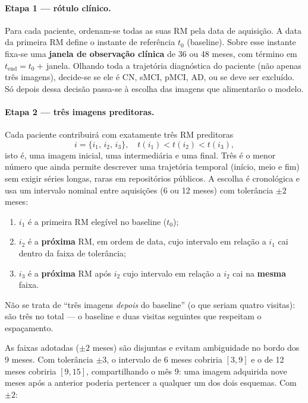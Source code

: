 \documentclass[review]{elsarticle}
\begin{document}
	\paragraph{Etapa 1 --- rótulo clínico.}
	Para cada paciente, ordenam-se todas as suas RM pela data de aquisição.
	A data da primeira RM define o instante de referência $t_0$ (baseline).
	Sobre esse instante fixa-se uma \textbf{janela de observação clínica} de 36 ou 48 meses, com término em $t_{\mathrm{end}} = t_0 +$\,janela.
	Olhando toda a trajetória diagnóstica do paciente (não apenas três imagens), decide-se se ele é CN, sMCI, pMCI, AD, ou se deve ser excluído.
	Só depois dessa decisão passa-se à escolha das imagens que alimentarão o modelo.
	
	\paragraph{Etapa 2 --- três imagens preditoras.}
	Cada paciente contribuirá com exatamente três RM preditoras
	\begin{equation}
		i=\{i_1,\,i_2,\,i_3\},
		\quad t(i_1)<t(i_2)<t(i_3),
	\end{equation}
	isto é, uma imagem inicial, uma intermediária e uma final.
	Três é o menor número que ainda permite descrever uma trajetória temporal (início, meio e fim) sem exigir séries longas, raras em repositórios públicos.
	A escolha é cronológica e usa um intervalo nominal entre aquisições (6 ou 12 meses) com tolerância $\pm 2$ meses:
	\begin{enumerate}
		\item $i_1$ é a primeira RM elegível no baseline ($t_0$);
		\item $i_2$ é a \textbf{próxima} RM, em ordem de data, cujo intervalo em relação a $i_1$ cai dentro da faixa de tolerância;
		\item $i_3$ é a \textbf{próxima} RM após $i_2$ cujo intervalo em relação a $i_2$ cai na \textbf{mesma} faixa.
	\end{enumerate}
	Não se trata de ``três imagens \emph{depois} do baseline'' (o que seriam quatro visitas): são três no total --- o baseline e duas visitas seguintes que respeitam o espaçamento.
	
	As faixas adotadas ($\pm 2$ meses) são disjuntas e evitam ambiguidade no bordo dos 9 meses.
	Com tolerância $\pm 3$, o intervalo de 6 meses cobriria $[3,9]$ e o de 12 meses cobriria $[9,15]$, compartilhando o mês 9: uma imagem adquirida nove meses após a anterior poderia pertencer a qualquer um dos dois esquemas.
	Com $\pm 2$:
	
\end{document}

